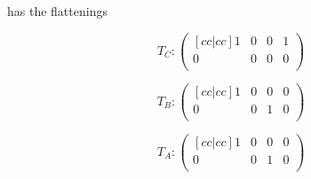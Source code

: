 \documentclass[11pt]{article} %
\renewcommand{\_}{\rule{0.2cm}{.5pt}}
\begin{document}
has the flattenings

\begin{equation}
T_{C}: 
\begin{pmatrix}[cc|cc]
1 & 0 & 0 & 1 \\
0 & 0 & 0 & 0 \\
\end{pmatrix}
\end{equation}

\begin{equation}
T_{B}: 
\begin{pmatrix}[cc|cc]
1 & 0 & 0 & 0 \\
0 & 0 & 1 & 0 \\
\end{pmatrix}
\end{equation}

\begin{equation}
T_{A}: 
\begin{pmatrix}[cc|cc]
1 & 0 & 0 & 0 \\
0 & 0 & 1 & 0 \\
\end{pmatrix}
\end{equation}
%
%
\end{document}
